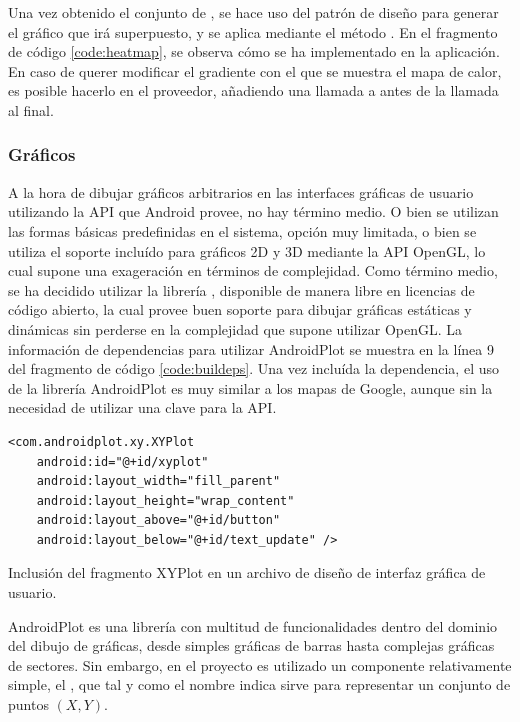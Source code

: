     Una vez obtenido el conjunto de , se hace uso del patrón de diseño   para generar el gráfico que irá superpuesto, y se aplica mediante el método . En el fragmento de código \ref{code:heatmap}, se observa cómo se ha implementado en la aplicación. En caso de querer modificar el gradiente con el que se muestra el mapa de calor, es posible hacerlo en el proveedor, añadiendo una llamada a  antes de la llamada al  final.

\subsubsection{Gráficos}
    A la hora de dibujar gráficos arbitrarios en las interfaces gráficas de usuario utilizando la API que Android provee, no hay término medio. O bien se utilizan las formas básicas predefinidas en el sistema, opción muy limitada, o bien se utiliza el soporte incluído para gráficos 2D y 3D mediante la API OpenGL, lo cual supone una exageración en términos de complejidad. Como término medio, se ha decidido utilizar la librería , disponible de manera libre en licencias de código abierto, la cual provee buen soporte para dibujar gráficas estáticas y dinámicas sin perderse en la complejidad que supone utilizar OpenGL.
    La información de dependencias para utilizar AndroidPlot se muestra en la línea 9 del fragmento de código \ref{code:buildeps}. Una vez incluída la dependencia, el uso de la librería AndroidPlot es muy similar a los mapas de Google, aunque sin la necesidad de utilizar una clave para la API. 
            
\begin{listing}[h] 
\begin{verbatim}
<com.androidplot.xy.XYPlot
    android:id="@+id/xyplot"
    android:layout_width="fill_parent"
    android:layout_height="wrap_content"
    android:layout_above="@+id/button"
    android:layout_below="@+id/text_update" />
\end{verbatim}
\caption{Inclusión del fragmento XYPlot en un archivo de diseño de interfaz gráfica de usuario.}
\label{code:plotlayout}
\end{listing}

    AndroidPlot es una librería con multitud de funcionalidades dentro del dominio del dibujo de gráficas, desde simples gráficas de barras hasta complejas gráficas de sectores. Sin embargo, en el proyecto es utilizado un componente relativamente simple, el , que tal y como el nombre indica sirve para representar un conjunto de puntos $(X,Y)$. 
    
